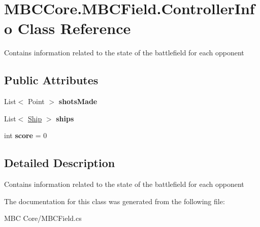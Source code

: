 \hypertarget{class_m_b_c_core_1_1_m_b_c_field_1_1_controller_info}{\section{M\-B\-C\-Core.\-M\-B\-C\-Field.\-Controller\-Info Class Reference}
\label{class_m_b_c_core_1_1_m_b_c_field_1_1_controller_info}
}


Contains information related to the state of the battlefield for each opponent 


\subsection*{Public Attributes}
\begin{DoxyCompactItemize}
\item 
\hypertarget{class_m_b_c_core_1_1_m_b_c_field_1_1_controller_info_a4d36cfe5286d24926e5f58b8e52995bd}{List$<$ Point $>$ {\bfseries shots\-Made}}\label{class_m_b_c_core_1_1_m_b_c_field_1_1_controller_info_a4d36cfe5286d24926e5f58b8e52995bd}

\item 
\hypertarget{class_m_b_c_core_1_1_m_b_c_field_1_1_controller_info_a080b5742bb1a6d0502ff5f5c1cc4f0b0}{List$<$ \hyperlink{class_m_b_c_core_1_1_ship}{Ship} $>$ {\bfseries ships}}\label{class_m_b_c_core_1_1_m_b_c_field_1_1_controller_info_a080b5742bb1a6d0502ff5f5c1cc4f0b0}

\item 
\hypertarget{class_m_b_c_core_1_1_m_b_c_field_1_1_controller_info_a91eda36923dbdf7c30a35021fcb9eb61}{int {\bfseries score} = 0}\label{class_m_b_c_core_1_1_m_b_c_field_1_1_controller_info_a91eda36923dbdf7c30a35021fcb9eb61}

\end{DoxyCompactItemize}


\subsection{Detailed Description}
Contains information related to the state of the battlefield for each opponent

The documentation for this class was generated from the following file\-:\begin{DoxyCompactItemize}
\item 
M\-B\-C Core/M\-B\-C\-Field.\-cs\end{DoxyCompactItemize}
